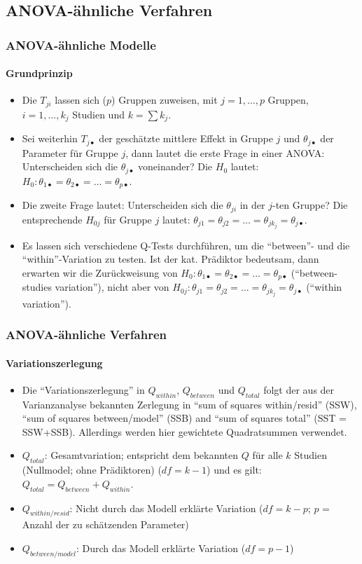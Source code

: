 \subsection{ANOVA-ähnliche Verfahren}


\begin{frame}\frametitle{ANOVA-ähnliche Modelle}\framesubtitle{Grundprinzip}
  \begin{itemize}
  \item Die $T_{ji}$ lassen sich ($p$) Gruppen zuweisen, mit $j = 1, \ldots,
    p$ Gruppen, $i = 1, \ldots, k_j$ Studien und $k=\sum k_j$.
  \item Sei weiterhin $T_{j\bullet}$ der geschätzte mittlere Effekt in Gruppe
    $j$ und $\theta_{j\bullet}$ der Parameter für Gruppe $j$, dann
    lautet die erste Frage in einer ANOVA: Unterscheiden sich die
    $\theta_{j\bullet}$ voneinander? Die $H_0$ lautet: $H_0: \theta_{1\bullet} =
    \theta_{2\bullet}=\ldots= \theta_{p\bullet}$.
  \item Die zweite Frage lautet: Unterscheiden sich die $\theta_{ji}$ in der
    $j$-ten Gruppe? Die entsprechende $H_{0j}$ für Gruppe $j$ lautet: $\theta_{j1} = \theta_{j2} = \ldots =
    \theta_{jk_j} = \theta_{j\bullet}$.
  \item Es lassen sich verschiedene Q-Tests durchführen,
    um die "`between"'- und die "`within"'-Variation zu testen. Ist der
    kat. Prädiktor bedeutsam, dann erwarten wir die Zurückweisung von $H_0: \theta_{1\bullet} =
    \theta_{2\bullet}=\ldots= \theta_{p\bullet}$ ("`between-studies variation"'), nicht aber von $H_{0j}: \theta_{j1} = \theta_{j2} = \ldots =
    \theta_{jk_j} = \theta_{j\bullet}$ ("`within variation"').
  \end{itemize}

  \citep[Quelle: Notation vertauscht, $i$ = Studiensubskript][]{becker_edf_2010}

\end{frame}



\begin{frame}
  \frametitle{ANOVA-ähnliche Verfahren}\framesubtitle{Variationszerlegung}
  \begin{itemize}
  \item Die "`Variationszerlegung"' in  $Q_{within}$, $Q_{between}$ und $Q_{total}$ folgt der aus der Varianzanalyse
    bekannten Zerlegung in "`sum of squares within/resid"' (SSW), "`sum of squares between/model"' (SSB) and "`sum of
    squares total"' (SST = SSW+SSB). Allerdings werden hier gewichtete Quadratsummen verwendet.
  \item $Q_{total}$: Gesamtvariation; entspricht dem bekannten $Q$ für alle $k$ Studien (Nullmodel; ohne Prädiktoren)
  ($df = k-1$) und es gilt: $Q_{total} = Q_{between} + Q_{within}$.
\item $Q_{within/resid}$: Nicht durch das Modell erklärte Variation ($df = k-p$; $p$ = Anzahl der zu schätzenden Parameter)
\item $Q_{between/model}$: Durch das Modell erklärte Variation ($df = p-1$)
\end{itemize}
\end{frame}


